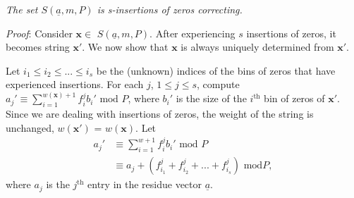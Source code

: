 \begin{lemma}\textit{The set
$S(\underline{a},m,P)$ is s-insertions of zeros
correcting.}\end{lemma}

\textit{Proof}: Consider $\mathbf{x} \in$ $S(\underline{a},m,P)$.
After experiencing $s$ insertions of zeros, it becomes string
$\mathbf{x'}$. We now show that $\mathbf{x}$ is always uniquely
determined from $\mathbf{x'}$.


Let $i_1 \leq i_2 \leq ... \leq i_s$ be the (unknown) indices of
the bins of zeros that have experienced insertions. For each $j$,
$1\leq j \leq s$, compute $a_j'\equiv \sum_{i=1}^{w(\mathbf{x})+1}
f_i^jb_i' \text{ mod } P$, where $b_i'$ is the size of the
$i^{\text{th}}$ bin of zeros of $\mathbf{x'}$. Since we are
dealing with insertions of zeros, the weight of the string is
unchanged, $w(\mathbf{x'})$ = $w(\mathbf{x})$. Let
\begin{equation}\begin{array}{ll}
a_j'& \equiv \sum_{i=1}^{w+1} f_i^jb_i' \text{ mod } P\\
{}  & \equiv a_j + (f_{i_1}^j+f_{i_2}^j+...+f_{i_s}^j) \text{ mod
}P,
\end{array}
\end{equation}
where $a_j$ is the $j^{\text{th}}$ entry in the residue vector
$\underline{a}$.

